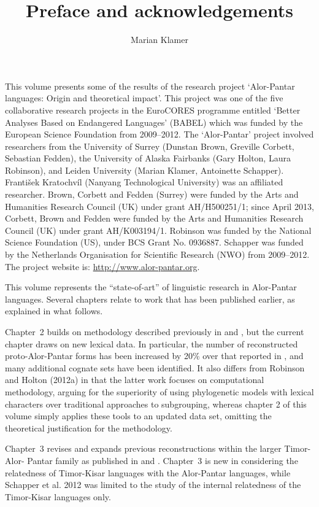 \documentclass[output=paper]{LSP/langsci}
\author{Marian Klamer}
\title{Preface and acknowledgements}
\begin{document}
\noindent
This volume presents some of the results of the research project `Alor-Pantar languages: Origin and theoretical impact'. This project was one of the five collaborative research projects in the EuroCORES programme entitled `Better Analyses Based on Endangered Languages' (BABEL) which was funded by the European Science Foundation from 2009--2012. The `Alor-Pantar' project involved researchers from the University of Surrey (Dunstan Brown, Greville Corbett, Sebastian Fedden), the University of Alaska Fairbanks (Gary Holton, Laura Robinson), and Leiden University (Marian Klamer, Antoinette Schapper). František Kratochvíl (Nanyang Technological University) was an affiliated researcher. Brown, Corbett and Fedden (Surrey) were funded by the Arts and Humanities Research Council (UK) under grant AH/H500251/1; since April 2013,  Corbett, Brown and Fedden were funded by the Arts and Humanities Research Council (UK) under grant AH/K003194/1. Robinson was funded by the National Science Foundation (US), under BCS Grant No. 0936887. Schapper was funded by the Netherlands Organisation for Scientific Research (NWO) from 2009--2012. The project website is: \url{http://www.alor-pantar.org}.  
	
This volume represents the ``state-of-art'' of linguistic research in Alor-Pantar languages. Several chapters relate to work that has been published earlier, as explained in what follows. 

Chapter~2 builds on methodology described previously in \citet{HoltonEtAl2012} and \citet{RobinsonEtAl2012internal}, but the current chapter draws on new lexical data. In particular, the number of reconstructed proto-Alor-Pantar forms has been increased by 20\% over that reported in \citet{HoltonEtAl2012}, and many additional cognate sets have been identified. It also differs from Robinson and Holton (2012a) in that the latter work focuses on computational methodology, arguing for the superiority of using phylogenetic models with lexical characters over traditional approaches to subgrouping, whereas chapter 2 of this volume simply applies these tools to an updated data set, omitting the theoretical justification for the methodology. 

Chapter~3 revises and expands previous reconstructions within the larger Timor-Alor- Pantar family as published in \citet{HoltonEtAl2012} and \citet{SchapperEtAl2012}. Chapter~3 is new in considering the relatedness of Timor-Kisar languages with the Alor-Pantar languages, while Schapper et al. 2012 was limited to the study of the internal relatedness of the Timor-Kisar languages only.
\end{document}
